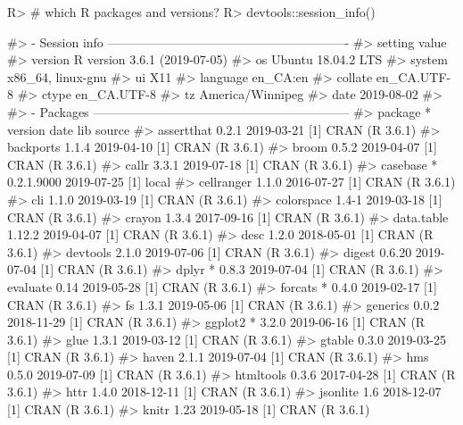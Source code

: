 \documentclass[
]{jss}
\begin{document}
\begin{CodeChunk}

\begin{CodeInput}
R> # which R packages and versions?
R> devtools::session_info()
\end{CodeInput}

\begin{CodeOutput}
#> - Session info ----------------------------------------------------------
#>  setting  value                       
#>  version  R version 3.6.1 (2019-07-05)
#>  os       Ubuntu 18.04.2 LTS          
#>  system   x86_64, linux-gnu           
#>  ui       X11                         
#>  language en_CA:en                    
#>  collate  en_CA.UTF-8                 
#>  ctype    en_CA.UTF-8                 
#>  tz       America/Winnipeg            
#>  date     2019-08-02                  
#> 
#> - Packages --------------------------------------------------------------
#>  package     * version    date       lib source        
#>  assertthat    0.2.1      2019-03-21 [1] CRAN (R 3.6.1)
#>  backports     1.1.4      2019-04-10 [1] CRAN (R 3.6.1)
#>  broom         0.5.2      2019-04-07 [1] CRAN (R 3.6.1)
#>  callr         3.3.1      2019-07-18 [1] CRAN (R 3.6.1)
#>  casebase    * 0.2.1.9000 2019-07-25 [1] local         
#>  cellranger    1.1.0      2016-07-27 [1] CRAN (R 3.6.1)
#>  cli           1.1.0      2019-03-19 [1] CRAN (R 3.6.1)
#>  colorspace    1.4-1      2019-03-18 [1] CRAN (R 3.6.1)
#>  crayon        1.3.4      2017-09-16 [1] CRAN (R 3.6.1)
#>  data.table    1.12.2     2019-04-07 [1] CRAN (R 3.6.1)
#>  desc          1.2.0      2018-05-01 [1] CRAN (R 3.6.1)
#>  devtools      2.1.0      2019-07-06 [1] CRAN (R 3.6.1)
#>  digest        0.6.20     2019-07-04 [1] CRAN (R 3.6.1)
#>  dplyr       * 0.8.3      2019-07-04 [1] CRAN (R 3.6.1)
#>  evaluate      0.14       2019-05-28 [1] CRAN (R 3.6.1)
#>  forcats     * 0.4.0      2019-02-17 [1] CRAN (R 3.6.1)
#>  fs            1.3.1      2019-05-06 [1] CRAN (R 3.6.1)
#>  generics      0.0.2      2018-11-29 [1] CRAN (R 3.6.1)
#>  ggplot2     * 3.2.0      2019-06-16 [1] CRAN (R 3.6.1)
#>  glue          1.3.1      2019-03-12 [1] CRAN (R 3.6.1)
#>  gtable        0.3.0      2019-03-25 [1] CRAN (R 3.6.1)
#>  haven         2.1.1      2019-07-04 [1] CRAN (R 3.6.1)
#>  hms           0.5.0      2019-07-09 [1] CRAN (R 3.6.1)
#>  htmltools     0.3.6      2017-04-28 [1] CRAN (R 3.6.1)
#>  httr          1.4.0      2018-12-11 [1] CRAN (R 3.6.1)
#>  jsonlite      1.6        2018-12-07 [1] CRAN (R 3.6.1)
#>  knitr         1.23       2019-05-18 [1] CRAN (R 3.6.1)

\end{CodeOutput}
\end{CodeChunk}
\end{document}

